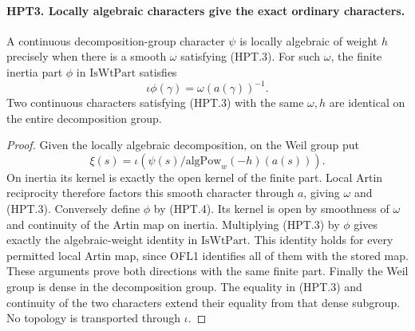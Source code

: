 \paragraph{HPT3. Locally algebraic characters give the exact ordinary characters.}
\label{claim:HPT3}
A continuous decomposition-group character $\psi$ is locally
algebraic of weight $h$ precisely when there is a smooth $\omega$
satisfying (HPT.3).  For such $\omega$, the finite inertia part
$\phi$ in $\mathrm{IsWtPart}$ satisfies
\[
                 \iota\phi(\gamma)=\omega(a(\gamma))^{-1}.
                                                               \tag{HPT.4}
\]
Two continuous characters satisfying (HPT.3) with the same
$\omega,h$ are identical on the entire decomposition group.
\begin{proof}
Given the locally algebraic decomposition, on the Weil group put
\[
       \xi(s)=\iota(\psi(s)/\mathrm{algPow}_w(-h)(a(s))).
\]
On inertia its kernel is exactly the open kernel of the finite
part.  Local Artin reciprocity therefore factors this smooth
character through $a$, giving $\omega$ and (HPT.3).
Conversely define $\phi$ by (HPT.4).  Its kernel is open by
smoothness of $\omega$ and continuity of the Artin map on inertia.
Multiplying (HPT.3) by $\phi$ gives exactly the algebraic-weight
identity in $\mathrm{IsWtPart}$.  This identity holds for every
permitted local Artin map, since OFL1 identifies all of them with
the stored map.  These arguments prove both directions with the
same finite part.  Finally the Weil group is dense in the
decomposition group.  The equality in (HPT.3) and continuity of
the two characters extend their equality from that dense subgroup.
No topology is transported through $\iota$.
\end{proof}

